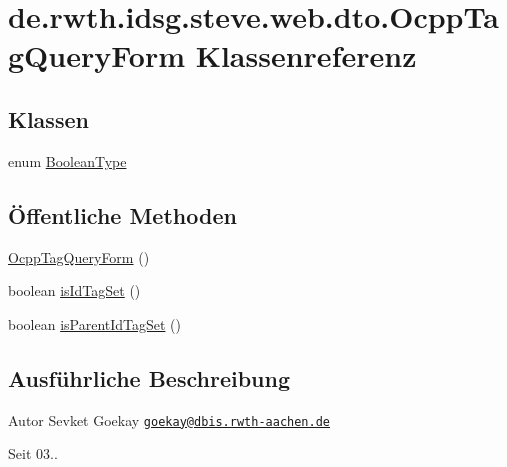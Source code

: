 \hypertarget{classde_1_1rwth_1_1idsg_1_1steve_1_1web_1_1dto_1_1_ocpp_tag_query_form}{\section{de.\+rwth.\+idsg.\+steve.\+web.\+dto.\+Ocpp\+Tag\+Query\+Form Klassenreferenz}
\label{classde_1_1rwth_1_1idsg_1_1steve_1_1web_1_1dto_1_1_ocpp_tag_query_form}
}
\subsection*{Klassen}
\begin{DoxyCompactItemize}
\item 
enum \hyperlink{enumde_1_1rwth_1_1idsg_1_1steve_1_1web_1_1dto_1_1_ocpp_tag_query_form_1_1_boolean_type}{Boolean\+Type}
\end{DoxyCompactItemize}
\subsection*{Öffentliche Methoden}
\begin{DoxyCompactItemize}
\item 
\hyperlink{classde_1_1rwth_1_1idsg_1_1steve_1_1web_1_1dto_1_1_ocpp_tag_query_form_ac94266acac17495329bb67c21a51321e}{Ocpp\+Tag\+Query\+Form} ()
\item 
boolean \hyperlink{classde_1_1rwth_1_1idsg_1_1steve_1_1web_1_1dto_1_1_ocpp_tag_query_form_ad80ab4e2b8102fbf51d4156d43bd82b1}{is\+Id\+Tag\+Set} ()
\item 
boolean \hyperlink{classde_1_1rwth_1_1idsg_1_1steve_1_1web_1_1dto_1_1_ocpp_tag_query_form_a7d5d727bfcd45659ff7efcc3692023c0}{is\+Parent\+Id\+Tag\+Set} ()
\end{DoxyCompactItemize}


\subsection{Ausführliche Beschreibung}
\begin{DoxyAuthor}{Autor}
Sevket Goekay \href{mailto:goekay@dbis.rwth-aachen.de}{\tt goekay@dbis.\+rwth-\/aachen.\+de} 
\end{DoxyAuthor}
\begin{DoxySince}{Seit}
03.. 
\end{DoxySince}


